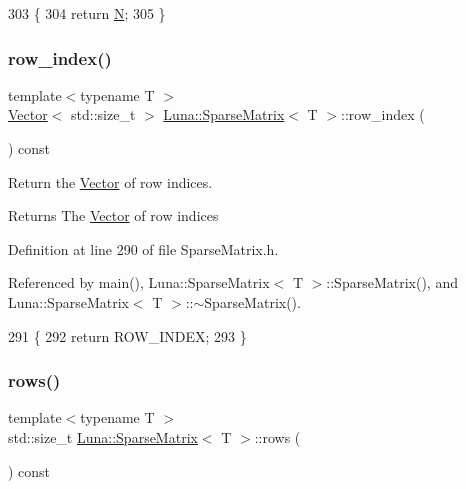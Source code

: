 \begin{DoxyCode}
303   \{
304     \textcolor{keywordflow}{return} \hyperlink{namespaceHeat__plot_a7d050092798e28458a263710837bda77}{N};
305   \}
\end{DoxyCode}
\mbox{\label{classLuna_1_1SparseMatrix_a3a430b487f83ac9ef35ed322e1b94c29}} 
\subsubsection{\texorpdfstring{row\+\_\+index()}{row\_index()}}
{\footnotesize\ttfamily template$<$typename T $>$ \\
\hyperlink{classLuna_1_1Vector}{Vector}$<$ std\+::size\+\_\+t $>$ \hyperlink{classLuna_1_1SparseMatrix}{Luna\+::\+Sparse\+Matrix}$<$ T $>$\+::row\+\_\+index (\begin{DoxyParamCaption}{ }\end{DoxyParamCaption}) const\hspace{0.3cm}{\ttfamily [inline]}}



Return the \hyperlink{classLuna_1_1Vector}{Vector} of row indices. 

\begin{DoxyReturn}{Returns}
The \hyperlink{classLuna_1_1Vector}{Vector} of row indices 
\end{DoxyReturn}


Definition at line 290 of file Sparse\+Matrix.\+h.



Referenced by main(), Luna\+::\+Sparse\+Matrix$<$ T $>$\+::\+Sparse\+Matrix(), and Luna\+::\+Sparse\+Matrix$<$ T $>$\+::$\sim$\+Sparse\+Matrix().


\begin{DoxyCode}
291   \{
292     \textcolor{keywordflow}{return} ROW\_INDEX;
293   \}
\end{DoxyCode}
\mbox{\label{classLuna_1_1SparseMatrix_a970319496e5f0b963e4810f2ecbd93b6}} 
\subsubsection{\texorpdfstring{rows()}{rows()}}
{\footnotesize\ttfamily template$<$typename T $>$ \\
std\+::size\+\_\+t \hyperlink{classLuna_1_1SparseMatrix}{Luna\+::\+Sparse\+Matrix}$<$ T $>$\+::rows (\begin{DoxyParamCaption}{ }\end{DoxyParamCaption}) const\hspace{0.3cm}{\ttfamily [inline]}}




